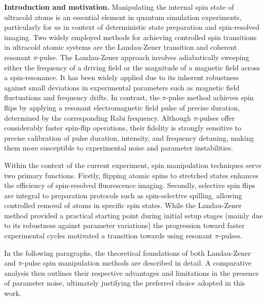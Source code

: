 
\textbf{Introduction and motivation.}
Manipulating the internal spin state of ultracold atoms is an essential element in quantum simulation experiments, particularly for us in context of deterministic state preparation and spin-resolved imaging.
Two widely employed methods for achieving controlled spin transitions in ultracold atomic systems are the Landau-Zener transition and coherent resonant $\pi$-pulse. The Landau-Zener approach involves adiabatically sweeping either the frequency of a driving field or the magnitude of a magnetic field across a spin-resonance. It has been widely applied due to its inherent robustness against small deviations in experimental parameters such as magnetic field fluctuations and frequency drifts. In contrast, the $\pi$-pulse method achieves spin flips by applying a resonant electromagnetic field pulse of precise duration, determined by the corresponding Rabi frequency. Although $\pi$-pulses offer considerably faster spin-flip operations, their fidelity is strongly sensitive to precise calibration of pulse duration, intensity, and frequency detuning, making them more susceptible to experimental noise and parameter instabilities.

Within the context of the current experiment, spin manipulation techniques serve two primary functions. Firstly, flipping atomic spins to stretched states enhances the efficiency of spin-resolved fluorescence imaging. Secondly, selective spin flips are integral to preparation protocols such as spin-selective spilling, allowing controlled removal of atoms in specific spin states. While the Landau-Zener method provided a practical starting point during initial setup stages (mainly due to its robustness against parameter variations) the progression toward faster experimental cycles motivated a transition towards using resonant $\pi$-pulses.

In the following paragraphs, the theoretical foundations of both Landau-Zener and $\pi$-pulse spin manipulation methods are described in detail. A comparative analysis then outlines their respective advantages and limitations in the presence of parameter noise, ultimately justifying the preferred choice adopted in this work.



